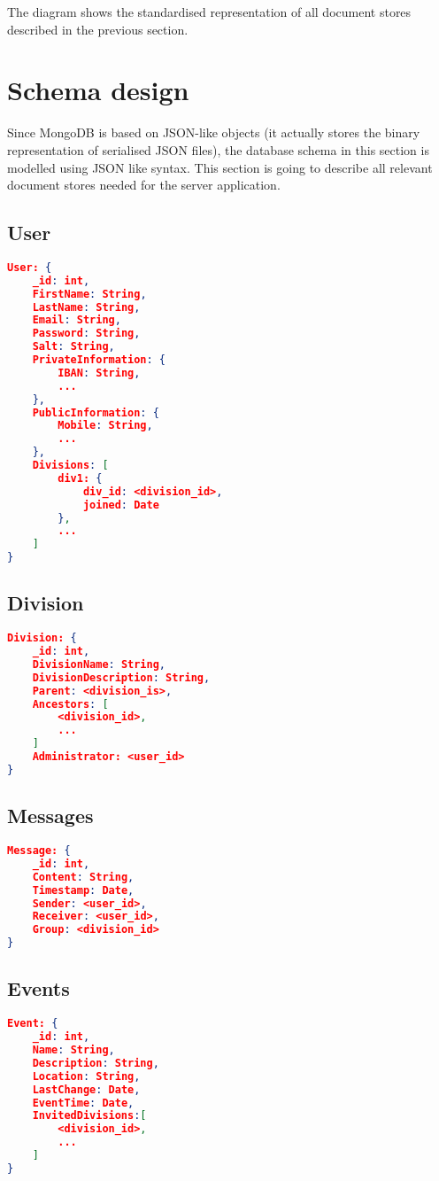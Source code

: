 The diagram shows the standardised representation of all document stores described in the previous section.

\section{Schema design}
Since MongoDB is based on JSON-like objects (it actually stores the binary representation of serialised JSON files), the database schema in this section is modelled using JSON like syntax. This section is going to describe all relevant document stores needed for the server application.

\subsection{User}
\begin{lstlisting}[language=json, caption=\emph{User}-document store]
User: {
    _id: int,  
    FirstName: String, 
    LastName: String, 
    Email: String,
    Password: String,
    Salt: String,
    PrivateInformation: {
        IBAN: String,
        ...
    },
    PublicInformation: {
        Mobile: String,
        ...
    },
    Divisions: [
        div1: {
            div_id: <division_id>,
            joined: Date
        },
        ...
    ]
}
\end{lstlisting}

\subsection{Division}
\begin{lstlisting}[language=json, caption=\emph{Division}-document store]
Division: {
    _id: int,  
    DivisionName: String,
    DivisionDescription: String,
    Parent: <division_is>,
    Ancestors: [
        <division_id>,
        ...
    ]
    Administrator: <user_id>
}
\end{lstlisting}

\subsection{Messages}
\begin{lstlisting}[language=json, caption=\emph{Message}-document store]
Message: {
    _id: int,  
    Content: String,
    Timestamp: Date,
    Sender: <user_id>,
    Receiver: <user_id>,
    Group: <division_id>
}
\end{lstlisting}

\subsection{Events}
\begin{lstlisting}[language=json, caption=\emph{Event}-document store]
Event: {
    _id: int,  
    Name: String,
    Description: String,
    Location: String,
    LastChange: Date,
    EventTime: Date,
    InvitedDivisions:[
        <division_id>,
        ...
    ]
}
\end{lstlisting}

